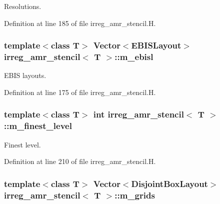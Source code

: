 Resolutions. 



Definition at line 185 of file irreg\+\_\+amr\+\_\+stencil.\+H.

\subsubsection[{\texorpdfstring{m\+\_\+ebisl}{m_ebisl}}]{\setlength{\rightskip}{0pt plus 5cm}template$<$class T$>$ Vector$<$E\+B\+I\+S\+Layout$>$ {\bf irreg\+\_\+amr\+\_\+stencil}$<$ T $>$\+::m\+\_\+ebisl\hspace{0.3cm}{\ttfamily [protected]}}\hypertarget{classirreg__amr__stencil_a290ad2f3e656239f0bf2008df5355cef}{}\label{classirreg__amr__stencil_a290ad2f3e656239f0bf2008df5355cef}


E\+B\+IS layouts. 



Definition at line 175 of file irreg\+\_\+amr\+\_\+stencil.\+H.

\subsubsection[{\texorpdfstring{m\+\_\+finest\+\_\+level}{m_finest_level}}]{\setlength{\rightskip}{0pt plus 5cm}template$<$class T$>$ int {\bf irreg\+\_\+amr\+\_\+stencil}$<$ T $>$\+::m\+\_\+finest\+\_\+level\hspace{0.3cm}{\ttfamily [protected]}}\hypertarget{classirreg__amr__stencil_a2fb8254dfa18387b72f3ec657e29e6c8}{}\label{classirreg__amr__stencil_a2fb8254dfa18387b72f3ec657e29e6c8}


Finest level. 



Definition at line 210 of file irreg\+\_\+amr\+\_\+stencil.\+H.

\subsubsection[{\texorpdfstring{m\+\_\+grids}{m_grids}}]{\setlength{\rightskip}{0pt plus 5cm}template$<$class T$>$ Vector$<$Disjoint\+Box\+Layout$>$ {\bf irreg\+\_\+amr\+\_\+stencil}$<$ T $>$\+::m\+\_\+grids\hspace{0.3cm}{\ttfamily [protected]}}\hypertarget{classirreg__amr__stencil_a54f0ac2e87963c4c65c09ad4ec8b28c8}{}\label{classirreg__amr__stencil_a54f0ac2e87963c4c65c09ad4ec8b28c8}


